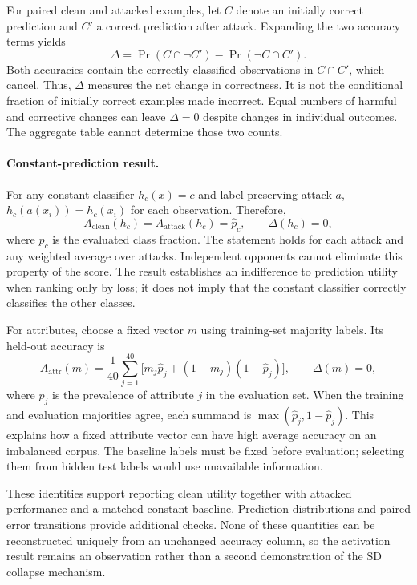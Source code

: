 For paired clean and attacked examples, let $C$ denote an initially correct prediction and
$C'$ a correct prediction after attack. Expanding the two accuracy terms yields
\begin{equation}
  \Delta=\Pr(C\cap\neg C')-\Pr(\neg C\cap C').
  \label{eq:advml:cancellation}
\end{equation}
Both accuracies contain the correctly classified observations in $C\cap C'$, which cancel.
Thus, $\Delta$ measures the net change in correctness. It is not the conditional fraction
of initially correct examples made incorrect. Equal numbers of harmful and corrective
changes can leave $\Delta=0$ despite changes in individual outcomes. The aggregate table
cannot determine those two counts.

\paragraph{Constant-prediction result.} For any constant classifier $h_c(x)=c$ and
label-preserving attack $a$, $h_c(a(x_i))=h_c(x_i)$ for each observation. Therefore,
\begin{equation}
  A_{\mathrm{clean}}(h_c)=A_{\mathrm{attack}}(h_c)
  =\widehat p_c,\qquad \Delta(h_c)=0,
  \label{eq:advml:constant}
\end{equation}
where $\widehat p_c$ is the evaluated class fraction. The statement holds for each attack
and any weighted average over attacks. Independent opponents cannot eliminate this property
of the score. The result establishes an indifference to prediction utility when ranking
only by loss; it does not imply that the constant classifier correctly classifies the other
classes.

For attributes, choose a fixed vector $m$ using training-set majority labels. Its held-out
accuracy is
\begin{equation}
  A_{\mathrm{attr}}(m)
  =\frac1{40}\sum_{j=1}^{40}
    \bigl[m_j\widehat p_j+(1-m_j)(1-\widehat p_j)\bigr],
  \qquad \Delta(m)=0,
  \label{eq:advml:constant-attributes}
\end{equation}
where $\widehat p_j$ is the prevalence of attribute $j$ in the evaluation set. When the
training and evaluation majorities agree, each summand is
$\max(\widehat p_j,1-\widehat p_j)$. This explains how a fixed attribute vector can have
high average accuracy on an imbalanced corpus. The baseline labels must be fixed before
evaluation; selecting them from hidden test labels would use unavailable information.

These identities support reporting clean utility together with attacked performance and a
matched constant baseline. Prediction distributions and paired error transitions provide
additional checks. None of these quantities can be reconstructed uniquely from an unchanged
accuracy column, so the activation result remains an observation rather than a second
demonstration of the SD collapse mechanism.

